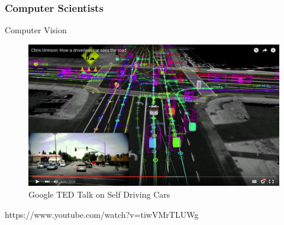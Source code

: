 \documentclass{beamer}
\begin{document}
\begin{frame}
  \frametitle{Computer Scientists}
  \center Computer Vision
  \begin{figure} \centering 
    \includegraphics[width=.8\textwidth]{figs/compsci/google-comp-vision.png}
    \caption{Google TED Talk on Self Driving Cars}
  \end{figure}
  {\small https://www.youtube.com/watch?v=tiwVMrTLUWg}
\end{frame}
\end{document}
